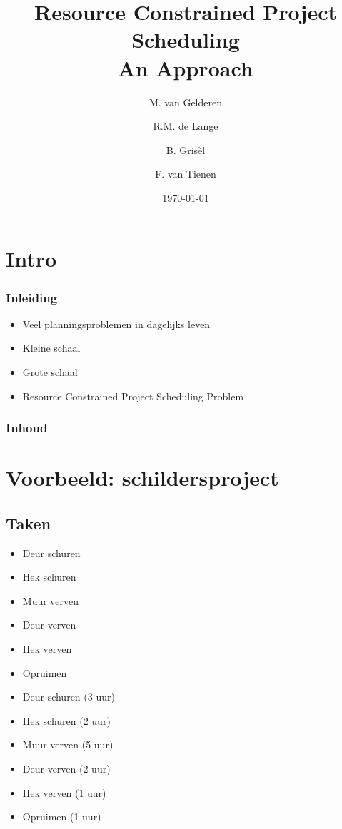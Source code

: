\documentclass{beamer}
\title[RCPS]{Resource Constrained Project Scheduling\\
An Approach}
\author{M. van Gelderen  \and
    R.M. de Lange \and
    B. Gris\`el \and
    F. van Tienen}
\institute{TU Delft}
\date{\today}
\theoremstyle{definition}
\begin{document}
\begin{frame}
\titlepage
\end{frame}

\section*{Intro}
\begin{frame}
    \frametitle{Inleiding}
    \begin{itemize}
	\item Veel planningsproblemen in dagelijks leven
        \item Kleine schaal
        \item Grote schaal
	\item Resource Constrained Project Scheduling Problem
    \end{itemize}
\end{frame}

\begin{frame}
    \frametitle{Inhoud}
    \tableofcontents
\end{frame}

\section{Voorbeeld: schildersproject}

\subsection{Taken}
\begin{frame}
	\begin{itemize}
		\item Deur schuren
		\item Hek schuren
		\item Muur verven
		\item Deur verven
		\item Hek verven
		\item Opruimen
	\end{itemize}
\end{frame}

\begin{frame}
	\begin{itemize}
		\item Deur schuren (3 uur)
		\item Hek schuren (2 uur)
		\item Muur verven (5 uur)
		\item Deur verven (2 uur)
		\item Hek verven (1 uur)
		\item Opruimen (1 uur)
	\end{itemize}
\end{frame}
\end{document}
